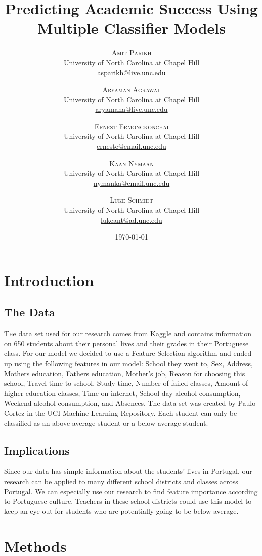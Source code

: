\documentclass[twoside,twocolumn]{article}
\title{Predicting Academic Success Using Multiple Classifier Models} %
\author{%
\textsc{Amit Parikh} \\[1ex] %
\normalsize University of North Carolina at Chapel Hill \\ %
\normalsize \href{mailto:john@smith.com}{asparikh@live.unc.edu} %
\and %
\textsc{Aryaman Agrawal} \\[1ex] %
\normalsize University of North Carolina at Chapel Hill \\ %
\normalsize \href{mailto:john@smith.com}{aryamana@live.unc.edu} %
\and %
\textsc{Ernest Ermongkonchai} \\[1ex] %
\normalsize University of North Carolina at Chapel Hill \\ %
\normalsize \href{mailto:jane@smith.com}{erneste@email.unc.edu} %
\and %
\textsc{Kaan Nymaan} \\[1ex] %
\normalsize University of North Carolina at Chapel Hill \\ %
\normalsize \href{mailto:jane@smith.com}{nymanka@email.unc.edu} %
\and %
\textsc{Luke Schmidt} \\[1ex] %
\normalsize University of North Carolina at Chapel Hill \\ %
\normalsize \href{mailto:jane@smith.com}{lukeant@ad.unc.edu} %
}
\date{\today} %
\begin{document}
\maketitle


\section{Introduction}
\subsection{The Data}
\lettrine[nindent=0em,lines=3] {T}he data set used for our research comes from Kaggle and contains information on 650 students about their personal lives and their grades in their Portuguese class. For our model we decided to use a Feature Selection algorithm and ended up using the following features in our model: School they went to, Sex, Address, Mothers education, Fathers education, Mother’s job, Reason for choosing this school, Travel time to school, Study time, Number of failed classes, Amount of higher education classes, Time on internet, School-day alcohol consumption, Weekend alcohol consumption, and Absences. The data set was created by Paulo Cortez in the UCI Machine Learning Repository. Each student can only be classified as an above-average student or a below-average student.
\subsection{Implications}
Since our data has simple information about the students' lives in Portugal, our research can be applied to many different school districts and classes across Portugal. We can especially use our research to find feature importance according to Portuguese culture. Teachers in these school districts could use this model to keep an eye out for students who are potentially going to be below average.


\section{Methods}
\end{document}
